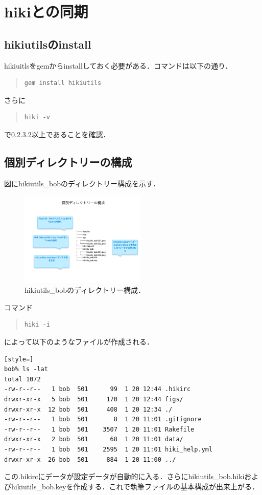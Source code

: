 \section{hikiとの同期}
\subsection{hikiutilsのinstall}
hikiuitlsをgemからinstallしておく必要がある．コマンドは以下の通り．
\begin{quote}\begin{verbatim}
gem install hikiutils
\end{verbatim}\end{quote}
さらに
\begin{quote}\begin{verbatim}
hiki -v
\end{verbatim}\end{quote}
で0.2.3.2以上であることを確認．

\subsection{個別ディレクトリーの構成}
図にhikiutils\_bobのディレクトリー構成を示す．

\begin{figure}[htbp]\begin{center}
\includegraphics[width=6cm,bb=0 0 442 500]{../figs/./hikiutils_bob.003.jpeg}
\caption{hikiutils\_bobのディレクトリー構成．}
\label{default}\end{center}\end{figure}
コマンド
\begin{quote}\begin{verbatim}
hiki -i
\end{verbatim}\end{quote}
によって以下のようなファイルが作成される．
\begin{lstlisting}[style=]
bob% ls -lat
total 1072
-rw-r--r--   1 bob  501      99  1 20 12:44 .hikirc
drwxr-xr-x   5 bob  501     170  1 20 12:44 figs/
drwxr-xr-x  12 bob  501     408  1 20 12:34 ./
-rw-r--r--   1 bob  501       8  1 20 11:01 .gitignore
-rw-r--r--   1 bob  501    3507  1 20 11:01 Rakefile
drwxr-xr-x   2 bob  501      68  1 20 11:01 data/
-rw-r--r--   1 bob  501    2595  1 20 11:01 hiki_help.yml
drwxr-xr-x  26 bob  501     884  1 20 11:00 ../
\end{lstlisting}
この.hikircにデータが設定データが自動的に入る．さらにhikiutils\_bob.hikiおよびhikiutils\_bob.keyを作成する．これで執筆ファイルの基本構成が出来上がる．

